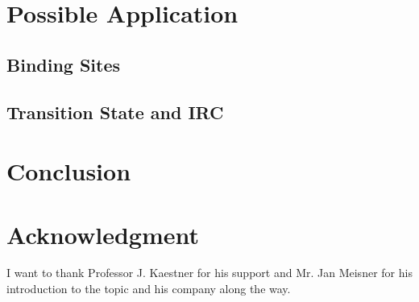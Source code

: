 \documentclass[8.5pt,twoside,twocolumn]{article}
\theoremstyle{standard}
\begin{document}



\newpage

\section{Possible Application}
\subsection{Binding Sites}
\label{Sec:Adv:Binding}


\subsection{Transition State and IRC}
\label{Sec:Adv:IRC}


\section{Conclusion}
\label{Sec:Con}

\section*{Acknowledgment}
I want to thank Professor J. Kaestner for his support and Mr. Jan Meisner for
his introduction to the topic and his company along the way.


% 

%
{}
\end{document}
